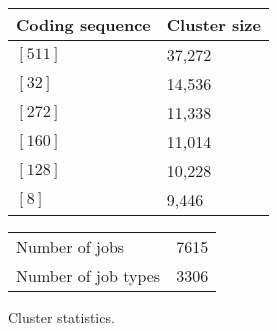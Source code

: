 \documentclass{jhps}
\begin{document}
\noindent\begin{minipage}{\textwidth}

\begingroup
  \centering
  \begin{tabular}{ll}
    Coding sequence & Cluster size \\
    \hline
    $[511]$ & 37,272 \\
    $[32]$  & 14,536 \\
    $[272]$ & 11,338 \\
    $[160]$ & 11,014 \\
    $[128]$ & 10,228 \\
    $[8]$   & 9,446  \\
  \end{tabular}
  \label{tab:bin:largest_clusters}
\endgroup

\medskip

\captionsetup{type=table}
\begingroup
  \begin{subtable}{\textwidth}
  \centering
  \begin{tabular}{lr}
    Number of jobs & 7615 \\
    Number of job types & 3306 \\
  \end{tabular}
  \caption{Cluster statistics.}
  \label{tab:bin_all:stats}
  \end{subtable}
\endgroup

\medskip


\end{minipage}
\end{document}
